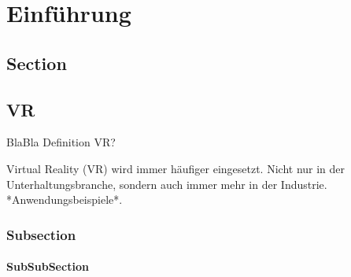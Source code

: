 \chapter{Einführung}

\section{Section}

\section{VR}
BlaBla\cite{Dummer2009}
Definition VR?

Virtual Reality (VR) wird immer häufiger eingesetzt. Nicht nur in der Unterhaltungsbranche, sondern auch immer mehr in der Industrie. *Anwendungsbeispiele*.

\subsection{Subsection}

\subsubsection{SubSubSection}